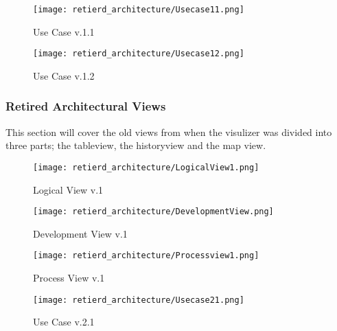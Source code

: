 \documentclass[../document]{subfiles}
\begin{document}
\begin{figure}[H]
	\centering
	\texttt{[image: retierd\_architecture/Usecase11.png]}
	\caption{Use Case v.1.1}
\end{figure}

\begin{figure}[H]
	\centering
	\texttt{[image: retierd\_architecture/Usecase12.png]}
	\caption{Use Case v.1.2}
\end{figure}

\subsubsection{Retired Architectural Views}
\label{retierd_architectural_views}
This section will cover the old views from when the visulizer was divided into three parts; the tableview, the historyview and the map view. 


\begin{figure}[H]
	\centering
	\texttt{[image: retierd\_architecture/LogicalView1.png]}
	\caption{Logical View v.1}
\end{figure}

\begin{figure}[H]
	\centering
	\texttt{[image: retierd\_architecture/DevelopmentView.png]}
	\caption{Development View v.1}
\end{figure}


\begin{figure}[H]
	\centering
	\texttt{[image: retierd\_architecture/Processview1.png]}
	\caption{Process View v.1}
\end{figure}

\begin{figure}[H]
	\centering
	\texttt{[image: retierd\_architecture/Usecase21.png]}
	\caption{Use Case v.2.1}
\end{figure}
\end{document}
